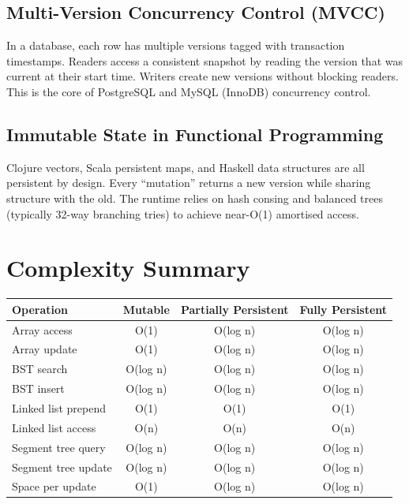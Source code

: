\subsection{Multi-Version Concurrency Control (MVCC)}

In a database, each row has multiple versions tagged with transaction timestamps. Readers access a consistent snapshot by reading the version that was current at their start time. Writers create new versions without blocking readers. This is the core of PostgreSQL and MySQL (InnoDB) concurrency control.

\subsection{Immutable State in Functional Programming}

Clojure vectors, Scala persistent maps, and Haskell data structures are all persistent by design. Every ``mutation'' returns a new version while sharing structure with the old. The runtime relies on hash consing and balanced trees (typically 32-way branching tries) to achieve near-O(1) amortised access.

\section{Complexity Summary}\label{sec21:complexity-summary}

\begin{center}
\begin{tabular}{lccc}
\toprule
Operation & Mutable & Partially Persistent & Fully Persistent \\
\midrule
Array access & O(1) & O(log n) & O(log n) \\
Array update & O(1) & O(log n) & O(log n) \\
BST search & O(log n) & O(log n) & O(log n) \\
BST insert & O(log n) & O(log n) & O(log n) \\
Linked list prepend & O(1) & O(1) & O(1) \\
Linked list access & O(n) & O(n) & O(n) \\
Segment tree query & O(log n) & O(log n) & O(log n) \\
Segment tree update & O(log n) & O(log n) & O(log n) \\
Space per update & O(1) & O(log n) & O(log n) \\
\bottomrule
\end{tabular}
\end{center}

